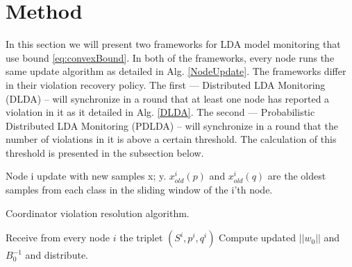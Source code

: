 \documentclass{sig-alternate-05-2015}
\begin{document}
\section{Method}
In this section we will present two frameworks for LDA model monitoring that use
bound \ref{eq:convexBound}. In both of the frameworks, every node runs the same
update algorithm as detailed in Alg. \ref{NodeUpdate}. 
The frameworks differ in their violation recovery policy. 
The first --- Distributed LDA Monitoring (DLDA) -- will synchronize in a round
that at least one node has reported a violation in it as it detailed in Alg.
\ref{DLDA}.
The second --- Probabilistic Distributed LDA Monitoring (PDLDA) -- will synchronize in
a round that the number of violations in it is above a certain threshold.
The calculation of this threshold is presented in the subsection below.


\begin{algorithm}
\caption{Node i update with new samples x; y.
$x_{old}^i(p)$ and $x_{old}^i(q)$ are the oldest samples from each class in the sliding window of the i'th node.} 
\label{NodeUpdate}
\end{algorithm}

\begin{algorithm}
\caption{Coordinator violation resolution algorithm.}\label{DLDA}
\begin{algorithmic}[1]
\State Receive from every node $i$ the triplet $(S^i,p^i,q^i)$
\State Compute updated $||w_0||$ and $B_0^{-1}$ and distribute.
\EndIf
\EndProcedure
\end{algorithmic}
\end{algorithm}
\end{document}
